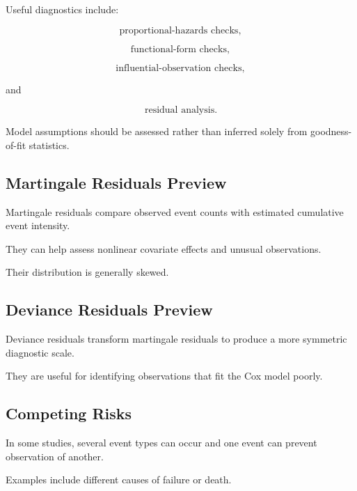 Useful diagnostics include:

\[
\boxed{
\text{proportional-hazards checks},
}
\]

\[
\boxed{
\text{functional-form checks},
}
\]

\[
\boxed{
\text{influential-observation checks},
}
\]

and

\[
\boxed{
\text{residual analysis}.
}
\]

Model assumptions should be assessed rather than inferred solely from
goodness-of-fit statistics.

\subsection{Martingale Residuals Preview}
\label{subsec:martingale-residuals-preview}

Martingale residuals compare observed event counts with estimated
cumulative event intensity.

They can help assess nonlinear covariate effects and unusual
observations.

Their distribution is generally skewed.

\subsection{Deviance Residuals Preview}
\label{subsec:survival-deviance-residuals}

Deviance residuals transform martingale residuals to produce a more
symmetric diagnostic scale.

They are useful for identifying observations that fit the Cox model
poorly.

\subsection{Competing Risks}
\label{subsec:competing-risks}

In some studies, several event types can occur and one event can prevent
observation of another.

Examples include different causes of failure or death.

